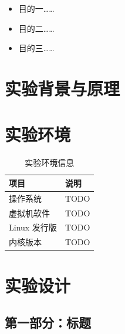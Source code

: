 \documentclass[12pt, a4paper]{article}
\begin{document}
\begin{itemize}
  \item 目的一……
  \item 目的二……
  \item 目的三……
\end{itemize}


\section{实验背景与原理}



\section{实验环境}

\begin{table}[H]
  \centering
  \caption{实验环境信息}
  \begin{tabularx}{\linewidth}{>{\centering\arraybackslash}p{3.5cm} >{\centering\arraybackslash}X}
    \toprule
    \textbf{项目} & \textbf{说明} \\
    \midrule
    操作系统      & TODO \\
    虚拟机软件    & TODO \\
    Linux 发行版  & TODO \\
    内核版本      & TODO \\
    \bottomrule
  \end{tabularx}
\end{table}


\section{实验设计}


\subsection{第一部分：标题}

\end{document}
